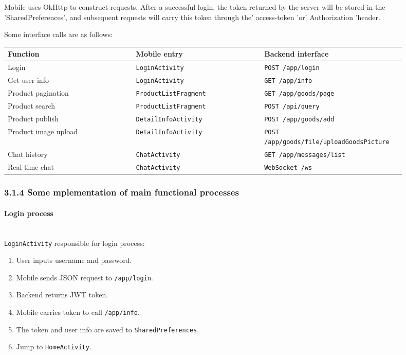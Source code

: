 \documentclass{article}
\begin{document}
Mobile uses OkHttp to construct requests. After a successful login, the token returned by the server will be stored in the 'SharedPreferences', and subsequent requests will carry this token through the' access-token 'or' Authorization 'header.

Some interface calls are as follows:

\begin{longtable}{p{0.30\linewidth}p{0.30\linewidth}p{0.30\linewidth}}
\toprule
\textbf{Function} & \textbf{Mobile entry} & \textbf{Backend interface} \\
\midrule
Login & \texttt{LoginActivity} & \texttt{POST /app/login} \\
Get user info & \texttt{LoginActivity} & \texttt{GET /app/info} \\
Product pagination & \texttt{ProductListFragment} & \texttt{GET /app/goods/page} \\
Product search & \texttt{ProductListFragment} & \texttt{POST /api/query} \\
Product publish & \texttt{DetailInfoActivity} & \texttt{POST /app/goods/add} \\
Product image upload & \texttt{DetailInfoActivity} & \texttt{POST /app/goods/file/uploadGoodsPicture} \\
Chat history & \texttt{ChatActivity} & \texttt{GET /app/messages/list} \\
Real-time chat & \texttt{ChatActivity} & \texttt{WebSocket /ws} \\
\bottomrule
\end{longtable}

\subsubsection{3.1.4 Some mplementation of main functional processes}

\paragraph{Login process}\mbox{}\\

\texttt{LoginActivity} responsible for login process:

\begin{enumerate}
    \item User inputs username and password.
    \item Mobile sends JSON request to \texttt{/app/login}.
    \item Backend returns JWT token.
    \item Mobile carries token to call \texttt{/app/info}.
    \item The token and user info are saved to \texttt{SharedPreferences}.
    \item Jump to \texttt{HomeActivity}.
\end{enumerate}
\end{document}
